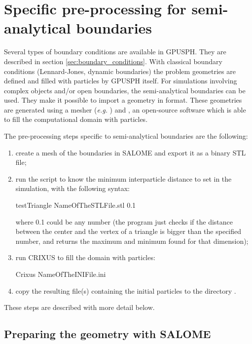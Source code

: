 \documentclass{../GPUSPHtemplate}
\begin{document}
\section{Specific pre-processing for semi-analytical boundaries}\label{sec:preprocess_sa}

Several types of boundary conditions are available in GPUSPH. 
They are described in section \ref{sec:boundary_conditions}.
With classical boundary conditions (Lennard-Jones, dynamic boundaries) the problem 
geometries are defined and filled with particles by GPUSPH itself.
For simulations involving complex objects and/or open boundaries, 
the semi-analytical boundaries can be used. They make it possible 
to import a geometry in  format. These geometries are 
generated using a mesher (\textit{e.g.} ) and ,
an open-source software which is able to fill the computational 
domain with particles. 

The pre-processing steps specific to semi-analytical boundaries 
are the following:
\begin{enumerate}
\item create a mesh of the boundaries in SALOME and 
export it as a binary STL file;
\item run the  script to know the 
minimum interparticle distance to set in the simulation, 
with the following syntax:
\begin{shellcode}
testTriangle NameOfTheSTLFile.stl 0.1
\end{shellcode}
where 0.1 could be any number (the program just checks if 
the distance between the center and the vertex of a 
triangle is bigger than the specified number, and returns 
the maximum and minimum found for that dimension);
\item run CRIXUS to fill the domain with particles:
\begin{shellcode}
Crixus NameOfTheINIFile.ini
\end{shellcode}
\item copy the resulting  file(s) containing 
the initial particles to the directory .
\end{enumerate}

These steps are described with more detail below.

\subsection{Preparing the geometry with SALOME}
\end{document}
